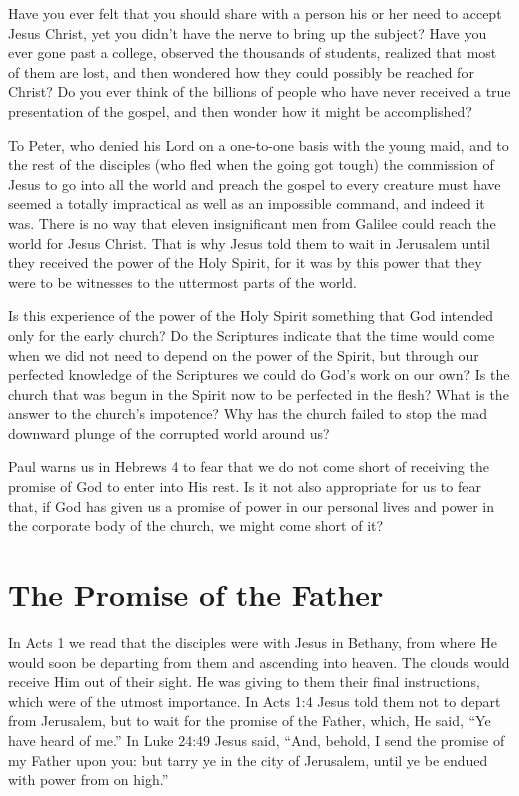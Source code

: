 Have you ever felt that you should share with a person
his or her need to accept Jesus Christ, yet you didn’t have
the nerve to bring up the subject? Have you ever gone past
a college, observed the thousands of students, realized that
most of them are lost, and then wondered how they could
possibly be reached for Christ? Do you ever think of the billions
of people who have never received a true presentation
of the gospel, and then wonder how it might be accomplished?

To Peter, who denied his Lord on a one-to-one basis
with the young maid, and to the rest of the disciples (who
fled when the going got tough) the commission of Jesus to
go into all the world and preach the gospel to every creature
must have seemed a totally impractical as well as an
impossible command, and indeed it was. There is no way
that eleven insignificant men from Galilee could reach the
world for Jesus Christ. That is why Jesus told them to wait
in Jerusalem until they received the power of the Holy Spirit,
for it was by this power that they were to be witnesses to the
uttermost parts of the world.

Is this experience of the power of the Holy Spirit something
that God intended only for the early church? Do the
Scriptures indicate that the time would come when we did
not need to depend on the power of the Spirit, but through
our perfected knowledge of the Scriptures we could do
God’s work on our own? Is the church that was begun in the
Spirit now to be perfected in the flesh? What is the answer
to the church’s impotence? Why has the church failed to
stop the mad downward plunge of the corrupted world
around us?

Paul warns us in Hebrews 4 to fear that we do not come
short of receiving the promise of God to enter into His rest.
Is it not also appropriate for us to fear that, if God has given
us a promise of power in our personal lives and power in
the corporate body of the church, we might come short of
it?


\section*{The Promise of the Father}

In Acts 1 we read that the disciples were with Jesus
in Bethany, from where He would soon be departing from
them and ascending into heaven. The clouds would receive
Him out of their sight. He was giving to them their final
instructions, which were of the utmost importance. In Acts
1:4 Jesus told them not to depart from Jerusalem, but to wait
for the promise of the Father, which, He said, “Ye have heard
of me.” In Luke 24:49 Jesus said, “And, behold, I send the
promise of my Father upon you: but tarry ye in the city of
Jerusalem, until ye be endued with power from on high.”

